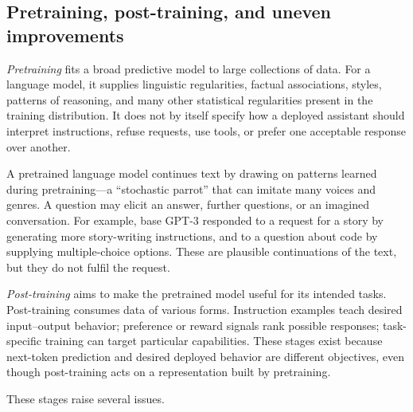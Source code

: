 \documentclass[11pt,twoside]{article}
\theoremstyle{definition}
\theoremstyle{remark}
\begin{document}
\subsection{Pretraining, post-training, and uneven improvements}

\emph{Pretraining} fits a broad predictive model to large collections of data. For a
language model, it supplies linguistic regularities, factual associations,
styles, patterns of reasoning, and many other statistical regularities present
in the training distribution. It does not by itself specify how a deployed
assistant should interpret instructions, refuse requests, use tools, or prefer
one acceptable response over another.

A pretrained language model continues text by drawing on patterns learned
during pretraining---a ``stochastic parrot'' that can imitate many voices and
genres. A question may elicit an answer, further questions, or an imagined
conversation. For example, base GPT-3 responded to a request for a story by
generating more story-writing instructions, and to a question about code by
supplying multiple-choice options. These are plausible continuations of the
text, but they do not fulfil the request.

\emph{Post-training} aims to make the pretrained model useful for its intended tasks.
Post-training consumes data of various forms.
Instruction examples teach
desired input--output behavior; preference or reward signals rank possible
responses; task-specific training can target particular capabilities. These
stages exist because next-token prediction and desired deployed behavior are
different objectives, even though post-training acts on a representation built
by pretraining.

These stages raise several issues.
\end{document}
